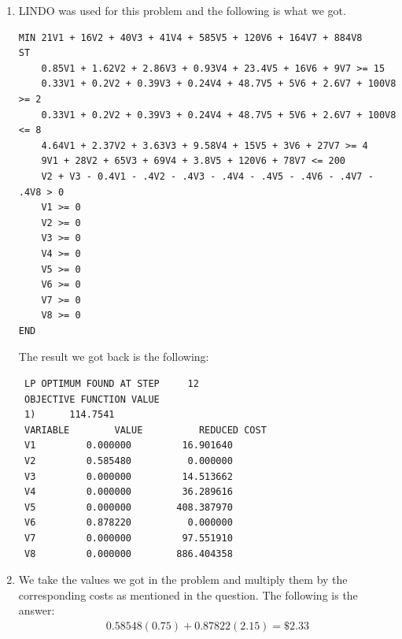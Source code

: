 \documentclass[11pt,letterpaper]{article}
\begin{document}
\begin{enumerate}
	\item LINDO was used for this problem and the following is what we got.
	\begin{verbatim}
MIN 21V1 + 16V2 + 40V3 + 41V4 + 585V5 + 120V6 + 164V7 + 884V8
ST
	0.85V1 + 1.62V2 + 2.86V3 + 0.93V4 + 23.4V5 + 16V6 + 9V7 >= 15
	0.33V1 + 0.2V2 + 0.39V3 + 0.24V4 + 48.7V5 + 5V6 + 2.6V7 + 100V8 >= 2
	0.33V1 + 0.2V2 + 0.39V3 + 0.24V4 + 48.7V5 + 5V6 + 2.6V7 + 100V8 <= 8
	4.64V1 + 2.37V2 + 3.63V3 + 9.58V4 + 15V5 + 3V6 + 27V7 >= 4
	9V1 + 28V2 + 65V3 + 69V4 + 3.8V5 + 120V6 + 78V7 <= 200
	V2 + V3 - 0.4V1 - .4V2 - .4V3 - .4V4 - .4V5 - .4V6 - .4V7 - .4V8 > 0
	V1 >= 0 
	V2 >= 0
	V3 >= 0
	V4 >= 0
	V5 >= 0
	V6 >= 0
	V7 >= 0
	V8 >= 0
END
	\end{verbatim}
	
	The result we got back is the following:
	\begin{verbatim}
 LP OPTIMUM FOUND AT STEP     12
 OBJECTIVE FUNCTION VALUE
 1)      114.7541
 VARIABLE        VALUE          REDUCED COST
 V1         0.000000         16.901640
 V2         0.585480          0.000000
 V3         0.000000         14.513662
 V4         0.000000         36.289616
 V5         0.000000        408.387970
 V6         0.878220          0.000000
 V7         0.000000         97.551910
 V8         0.000000        886.404358
	\end{verbatim}
	\item We take the values we got in the problem and multiply them by the corresponding costs as mentioned in the question. The following is the answer:
	\begin{align*}
	0.58548(0.75) + 0.87822(2.15) = \$2.33
	\end{align*}
\end{enumerate}
\end{document}
